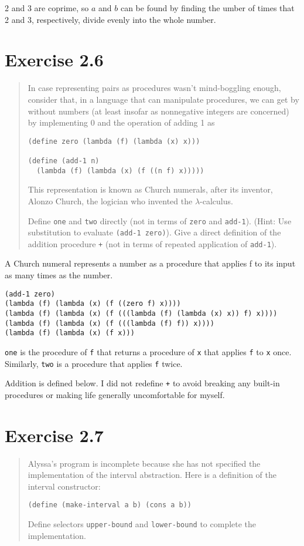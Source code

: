 \documentclass{article}
\begin{document}
2 and 3 are coprime, so $a$ and $b$ can be found by finding the umber of times
that 2 and 3, respectively, divide evenly into the whole number.


\section{Exercise 2.6}
\begin{quote}
    In case representing pairs as procedures wasn't mind-boggling enough,
    consider that, in a language that can manipulate procedures, we can get by
    without numbers (at least insofar as nonnegative integers are concerned) by
    implementing 0 and the operation of adding 1 as
    \begin{lstlisting}
(define zero (lambda (f) (lambda (x) x)))

(define (add-1 n)
  (lambda (f) (lambda (x) (f ((n f) x)))))
    \end{lstlisting}
    This representation is known as Church numerals, after its inventor, Alonzo
    Church, the logician who invented the $\lambda$-calculus.

    Define \texttt{one} and \texttt{two} directly (not in terms of
    \texttt{zero} and \texttt{add-1}). (Hint: Use substitution to evaluate
    \texttt{(add-1 zero)}). Give a direct definition of the addition procedure
    \texttt{+} (not in terms of repeated application of \texttt{add-1}).
\end{quote}

A Church numeral represents a number as a procedure that applies f to its input
as many times as the number.
\begin{lstlisting}
(add-1 zero)
(lambda (f) (lambda (x) (f ((zero f) x))))
(lambda (f) (lambda (x) (f (((lambda (f) (lambda (x) x)) f) x))))
(lambda (f) (lambda (x) (f (((lambda (f) f)) x))))
(lambda (f) (lambda (x) (f x)))
\end{lstlisting}
\texttt{one} is the procedure of \texttt{f} that returns a procedure of
\texttt{x} that applies \texttt{f} to \texttt{x} once. Similarly, \texttt{two}
is a procedure that applies \texttt{f} twice.


Addition is defined below. I did not redefine \texttt{+} to avoid breaking any
built-in procedures or making life generally uncomfortable for myself.


\section{Exercise 2.7}
\begin{quote}
    Alyssa's program is incomplete because she has not specified the
    implementation of the interval abstraction. Here is a definition of the
    interval constructor:
    \begin{lstlisting}
(define (make-interval a b) (cons a b))
    \end{lstlisting}
    Define selectors \texttt{upper-bound} and \texttt{lower-bound} to complete
    the implementation.
\end{quote}
\end{document}
